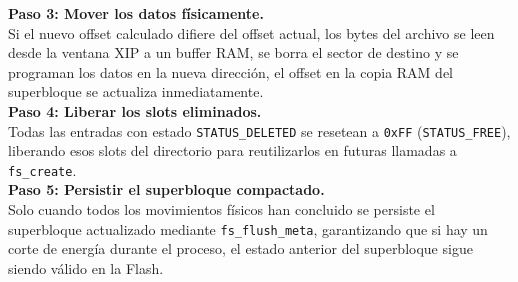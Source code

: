 \documentclass[12pt,letterpaper]{article}
\begin{document}
\textbf{Paso 3: Mover los datos físicamente.}\\
Si el nuevo offset calculado difiere del offset actual, los bytes del archivo se leen desde la ventana XIP a un
buffer RAM, se borra el sector de destino y se programan los datos en la nueva dirección, el offset en la copia
RAM del superbloque se actualiza inmediatamente.\\

\textbf{Paso 4: Liberar los slots eliminados.}\\
Todas las entradas con estado \texttt{STATUS\_DELETED} se resetean a \texttt{0xFF} (\texttt{STATUS\_FREE}),
liberando esos slots del directorio para reutilizarlos en futuras llamadas a \texttt{fs\_create}.\\

\textbf{Paso 5: Persistir el superbloque compactado.}\\
Solo cuando todos los movimientos físicos han concluido se persiste el superbloque actualizado mediante
\texttt{fs\_flush\_meta}, garantizando que si hay un corte de energía durante el proceso, el estado anterior del
superbloque sigue siendo válido en la Flash.
\end{document}
